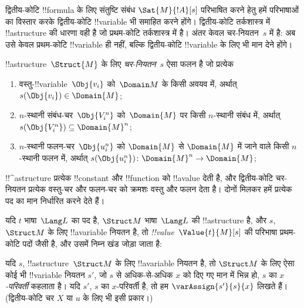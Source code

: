 \documentclass[../../../include/open-logic-section]{subfiles}
\begin{document}


\begin{explain}
द्वितीय-कोटि !!{formula} के लिए संतुष्टि संबंध $\Sat{M}{!A}[s]$ परिभाषित
करने हेतु हमें परिभाषाओं का विस्तार करके द्वितीय-कोटि !!{variable} भी
समाहित करने होंगे। द्वितीय-कोटि तर्कशास्त्र में !!a{structure} की धारणा वही
है जो प्रथम-कोटि तर्कशास्त्र में है। अंतर केवल चर-नियतन~$s$ में है: अब उसे
केवल प्रथम-कोटि !!{variable} ही नहीं, बल्कि द्वितीय-कोटि !!{variable} के लिए
भी मान देने होंगे।
\end{explain}

\begin{defn}[चर-नियतन]
!!a{structure}~$\Struct{M}$ के लिए \emph{चर-नियतन}~$s$ ऐसा फलन है जो प्रत्येक
\begin{enumerate}
\item वस्तु-!!{variable}~$\Obj{v_i}$ को~$\Domain M$ के किसी अवयव में,
  अर्थात् $s(\Obj{v_i}) \in \Domain{M}$;
\item $n$-स्थानी संबंध-चर~$\Obj{V_i^n}$ को~$\Domain{M}$ पर किसी
  $n$-स्थानी संबंध में, अर्थात् $s(\Obj{V_i^n}) \subseteq \Domain{M}^n$;
\item $n$-स्थानी फलन-चर~$\Obj{u_i^n}$ को $\Domain{M}$ से $\Domain{M}$ में
  जाने वाले किसी $n$-स्थानी फलन में, अर्थात्
  $s(\Obj{u_i^n})\colon \Domain{M}^n \to \Domain{M}$;
\end{enumerate}
\end{defn}

\begin{explain}
!!^a{structure} प्रत्येक !!{constant} और !!{function} को !!a{value} देती है,
और द्वितीय-कोटि चर-नियतन प्रत्येक वस्तु-चर और फलन-चर को क्रमशः वस्तु और फलन
देता है। दोनों मिलकर हमें प्रत्येक पद का मान निर्धारित करने देते हैं।
\end{explain}

\begin{defn}
यदि $t$ भाषा~$\Lang L$ का पद है, $\Struct M$ भाषा~$\Lang L$ की
!!a{structure} है, और $s$, $\Struct M$ के लिए !!a{variable} नियतन है, तो
\emph{!!{value}}~$\Value{t}{M}[s]$ की परिभाषा प्रथम-कोटि पदों जैसी है, और
उसमें निम्न खंड जोड़ा जाता है:
\begin{quote}
\end{quote}
\end{defn}

\begin{defn}[$x$-परिवर्ती]
यदि $s$, !!a{structure}~$\Struct M$ के लिए !!a{variable} नियतन है, तो
$\Struct M$ के लिए ऐसा कोई भी !!{variable} नियतन $s'$, जो $s$ से अधिक-से-अधिक
$x$ को दिए गए मान में भिन्न हो, $s$ का \emph{$x$-परिवर्ती} कहलाता है। यदि
$s'$, $s$ का $x$-परिवर्ती है, तो हम $\varAssign{s'}{s}{x}$ लिखते हैं।
(द्वितीय-कोटि चर $X$ या $u$ के लिए भी इसी प्रकार।)
\end{defn}
\end{document}
